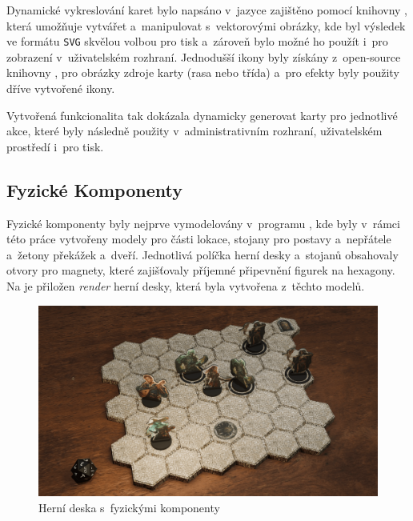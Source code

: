 Dynamické vykreslování karet bylo napsáno v~jazyce  zajištěno pomocí knihovny , která umožňuje vytvářet a~manipulovat s~vektorovými obrázky, kde byl výsledek ve formátu \texttt{SVG} skvělou volbou pro tisk a~zároveň bylo možné ho použít i~pro zobrazení v~uživatelském rozhraní. Jednodušší ikony byly získány z~open-source knihovny , pro obrázky zdroje karty (rasa nebo třída) a~pro efekty byly použity dříve vytvořené ikony.

Vytvořená funkcionalita tak dokázala dynamicky generovat karty pro jednotlivé akce, které byly následně použity v~administrativním rozhraní, uživatelském prostředí i~pro tisk.

\subsection{Fyzické Komponenty}
\label{subsec:physical_components}

Fyzické komponenty byly nejprve vymodelovány v~programu , kde byly v~rámci této práce vytvořeny modely pro části lokace, stojany pro postavy a~nepřátele a~žetony překážek a~dveří. Jednotlivá políčka herní desky a~stojanů obsahovaly otvory pro magnety, které zajišťovaly příjemné připevnění figurek na hexagony. Na  je přiložen \textit{render} herní desky, která byla vytvořena z~těchto modelů.

\begin{figure}[h]
    \centering
    \includegraphics[width=\textwidth]{figures/images/game.png}
    \caption{Herní deska s~fyzickými komponenty}
    \label{fig:game_board}
\end{figure}

